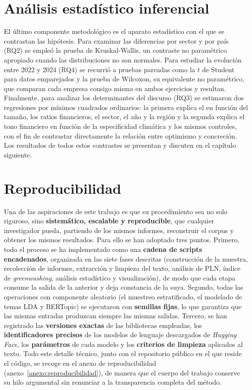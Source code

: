 \section{Análisis estadístico inferencial}
\label{sec:estadistica}

El último componente metodológico es el aparato estadístico con el que se contrastan las
hipótesis. Para examinar las diferencias por sector y por país (RQ2) se empleó la prueba de
Kruskal-Wallis, un contraste no paramétrico apropiado cuando las distribuciones no son normales. 
Para estudiar la evolución entre 2022 y 2024 (RQ4) se recurrió a pruebas pareadas como la $t$ de Student
para datos emparejados y la prueba de Wilcoxon, su equivalente no paramétrico, que comparan
cada empresa consigo misma en ambos ejercicios y resultan. Finalmente, para analizar los determinantes del discurso
(RQ3) se estimaron dos regresiones por mínimos cuadrados ordinarios: la primera explica el \gwindex{} en función del tamaño, los
ratios financieros, el sector, el año y la región y la segunda explica el tono financiero en
función de la especificidad climática y los mismos controles, con el fin de contrastar
directamente la relación entre optimismo y concreción. Los
resultados de todos estos contrastes se presentan y discuten en el capítulo siguiente.

\section{Reproducibilidad}
\label{sec:reproducibilidad}

Una de las aspiraciones de este trabajo es que su procedimiento sea no solo riguroso, sino
\textbf{sistemático, escalable y reproducible}, que cualquier investigador pueda, partiendo de
los mismos informes, reconstruir el corpus y obtener los mismos resultados. Para ello
se han adoptado tres puntos. Primero, todo el
proceso se ha implementado como una \textbf{cadena de scripts encadenados}, organizada en las
siete fases descritas (construcción de la muestra, recolección de informes, extracción y
limpieza del texto, análisis de PLN, índice de \textit{greenwashing}, análisis estadístico y
visualización), de modo que cada etapa consume la salida de la anterior y deja constancia de la
suya. Segundo, todas las operaciones con componente aleatorio (el muestreo estratificado, el
modelado de temas LDA y BERTopic) se ejecutaron con \textbf{semillas fijas}, lo que garantiza
que las mismas entradas produzcan siempre las mismas salidas. Tercero, se han registrado las
\textbf{versiones exactas} de las bibliotecas empleadas, los \textbf{identificadores precisos}
de los modelos de lenguaje descargados de \textit{Hugging Face}, los \textbf{parámetros} de cada
modelo y los \textbf{criterios de limpieza} aplicados al texto. Todo este detalle técnico, junto
con el repositorio público en el que reside el código, se recoge en el anexo de
reproducibilidad (anexo~\ref{anexo:reproducibilidad}), de manera que el cuerpo del trabajo
conserve su hilo argumental sin renunciar a la transparencia completa del método.
